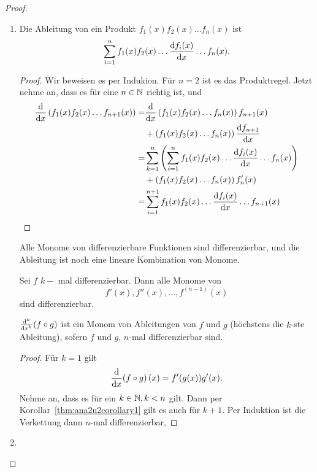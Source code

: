 \begin{proof}
	\begin{enumerate}[label=\roman*)]
		\item 
			\begin{Theorem}
				Die Ableitung von ein Produkt $f_1(x)f_2(x)\dots f_n(x)$ ist \[
				\sum_{i=1}^n f_1(x)f_2(x)\dots \dv{f_i(x)}{x}\dots f_n(x).\]
			\end{Theorem}
			\begin{proof}
				Wir beweisen es per Indukion. F\"{u}r $n=2$ ist es das Produktregel. Jetzt nehme an, dass es f\"{u}r eine $n\in \mathbb{N}$ richtig ist, und 
				\begin{align*}
					\dv{x}\left( f_1(x)f_2(x)\dots f_{n+1}(x) \right) =& \dv{x}\left( f_1(x)f_2(x)\dots f_n(x) \right) f_{n+1}(x)\\
											   &+\left( f_1(x)f_2(x)\dots f_n(x) \right) \dv{f_{n+1}}{x}\\
					=& \sum_{k=1}^{n}\left( \sum_{i=1}^n f_1(x)f_2(x)\dots \dv{f_i(x)}{x}\dots f_n(x) \right)\\
					 &+\left( f_1(x)f_2(x)\dots f_n(x) \right) f_n'(x)\\
					=&\sum_{i=1}^{n+1} f_1(x)f_2(x)\dots \dv{f_i(x)}{x}\dots f_{n+1}(x)
				\end{align*}
			\end{proof}
			\begin{Corollary}\label{thm:ana2u2corollary1}
				Alle Monome von differenzierbare Funktionen sind differenzierbar, und die Ableitung ist noch eine lineare Kombination von Monome.
			\end{Corollary}
			\begin{Corollary}
				Sei $f$ $k-$ mal differenzierbar. Dann alle Monome von \[f'(x),f''(x),\dots, f^{(n-1)}(x)\] sind differenzierbar.
			\end{Corollary}
			\begin{Theorem}
				$\dv[k]{x}(f\circ g)$ ist ein Monom von Ableitungen von $f$ und $g$ (höchstens die $k$-ste Ableitung), sofern $f$ und $g$, $n$-mal differenzierbar sind.
			\end{Theorem}
			\begin{proof}
				F\"{u}r $k=1$ gilt
				\[
					\dv{x}(f\circ g)\left(x \right) =f'(g(x))g'(x)
				.\] 
				Nehme an, dass es f\"{u}r ein $k\in \mathbb{N},k<n$ gilt. Dann per Korollar~\ref{thm:ana2u2corollary1} gilt es auch f\"{u}r $k+1$. Per Induktion ist die Verkettung dann $n$-mal differenzierbar,
			\end{proof}
		\item 

\end{enumerate}
\end{proof}
